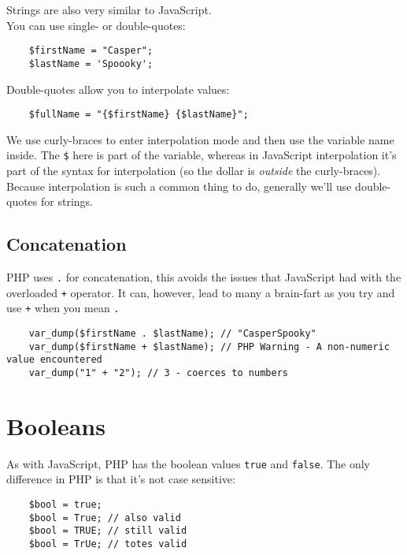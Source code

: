 Strings are also very similar to JavaScript.
\\

You can use single- or double-quotes:

\begin{verbatim}
    $firstName = "Casper";
    $lastName = 'Spoooky';
\end{verbatim}

Double-quotes allow you to interpolate values:

\begin{verbatim}
    $fullName = "{$firstName} {$lastName}";
\end{verbatim}

We use curly-braces to enter interpolation mode and then use the variable name inside. The \texttt{\$} here is part of the variable, whereas in JavaScript interpolation it's part of the syntax for interpolation (so the dollar is \textit{outside} the curly-braces).
\\

Because interpolation is such a common thing to do, generally we'll use double-quotes for strings.

\subsection{Concatenation}

PHP uses \texttt{.} for concatenation, this avoids the issues that JavaScript had with the overloaded \texttt{+} operator. It can, however, lead to many a brain-fart as you try and use \texttt{+} when you mean \texttt{.}

\begin{verbatim}
    var_dump($firstName . $lastName); // "CasperSpooky"
    var_dump($firstName + $lastName); // PHP Warning - A non-numeric value encountered
    var_dump("1" + "2"); // 3 - coerces to numbers
\end{verbatim}


\section{Booleans}

As with JavaScript, PHP has the boolean values \texttt{true} and \texttt{false}. The only difference in PHP is that it's not case sensitive:

\begin{verbatim}
    $bool = true;
    $bool = True; // also valid
    $bool = TRUE; // still valid
    $bool = TrUe; // totes valid
\end{verbatim}

